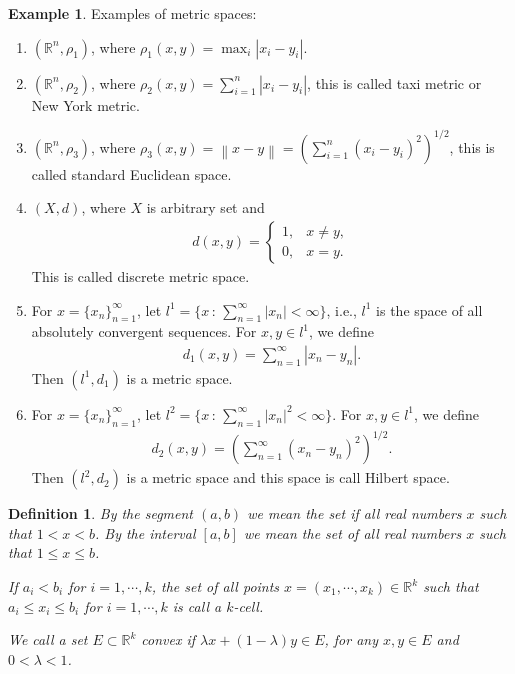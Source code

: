 \documentclass[10pt]{book}
\newtheorem{definition}{Definition}[chapter]
\theoremstyle{definition}
\newtheorem{example}{Example}[chapter]
\numberwithin{equation}{chapter}
\begin{document}
\begin{example}
Examples of metric spaces:
\begin{enumerate}[label=(\alph*)]
    \item $(\mathbb{R}^n,\rho_1)$, where $\rho_1(x,y) = \max_i \left|x_i - y_i\right|$.
    
    \item $(\mathbb{R}^n,\rho_2)$, where $\rho_2(x,y) = \sum^n_{i=1} |x_i-y_i|$, this is called taxi metric or New York metric. 
    
    \item $(\mathbb{R}^n,\rho_3)$, where $\rho_3(x,y) = \left\|x - y\right\| = \left(\sum^n_{i=1} (x_i - y_i)^2 \right)^{1/2}$, this is called standard Euclidean space.
    
    
    \item $(X,d)$, where $X$ is arbitrary set and 
    \begin{align*}
        d(x,y) = \begin{cases}
            1, & x \neq y, \\
            0, & x = y.
        \end{cases}
    \end{align*} 
    This is called discrete metric space.
    
    \item For $x = \{x_n\}^\infty_{n=1}$, let $l^1 = \{x \,:\, \sum^\infty_{n=1}\left|x_n\right| < \infty\}$, i.e., $l^1$ is the space of all absolutely convergent sequences. For $x, y \in l^1$, we define 
    \begin{align*}
        d_1(x,y) = \sum^\infty_{n=1} \left|x_n - y_n\right|.
    \end{align*}
    Then $(l^1,d_1)$ is a metric space.
    
    \item For $x = \{x_n\}^\infty_{n=1}$, let $l^2 = \{x  \,:\, \sum^\infty_{n=1}\left|x_n\right|^2 < \infty\}$. For $x, y \in l^1$, we define
    \begin{align*}
        d_2(x,y) = \left(\sum^\infty_{n=1} (x_n - y_n)^2\right)^{1/2}.
    \end{align*}
    Then $(l^2, d_2)$ is a metric space and this space is call Hilbert space.
\end{enumerate}
\end{example} 

\medskip

\begin{definition}
By the segment $(a,b)$ we mean the set if all real numbers $x$ such that $1 < x < b$. By the interval $[a,b]$ we mean the set of all real numbers $x$ such that $1 \leq x \leq b$. 

If $a_i < b_i$ for $i = 1, \cdots, k$, the set of all points $x = (x_1, \cdots, x_k) \in \mathbb{R}^k$ such that $a_i \leq x_i \leq b_i$ for $i = 1, \cdots, k$ is call a $k$-cell. 

We call a set $E \subset \mathbb{R}^k$ convex if $\lambda x + (1 - \lambda)y \in E$, for any $x,y \in E$ and $0 < \lambda < 1$.
\end{definition}
\end{document}
